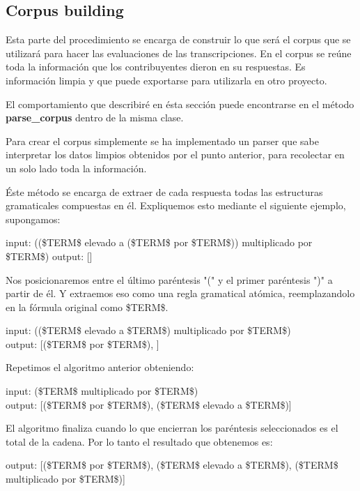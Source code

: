 \subsection{Corpus building}

Esta parte del procedimiento se encarga de construir lo que será el corpus que se utilizará para hacer las evaluaciones de las transcripciones. En el corpus se reúne toda la información que los contribuyentes dieron en su respuestas. Es información limpia y que puede exportarse para utilizarla en otro proyecto.

El comportamiento que describiré en ésta sección puede encontrarse en el método \textbf{parse\_corpus} dentro de la misma clase.

Para crear el corpus simplemente se ha implementado un parser que sabe interpretar los datos limpios obtenidos por el punto anterior, para recolectar en un solo lado toda la información.

Éste método se encarga de extraer de cada respuesta todas las estructuras gramaticales compuestas en él. Expliquemos esto mediante el siguiente ejemplo, supongamos:

\begin{tcolorbox}
input: ((\$TERM\$ elevado a (\$TERM\$ por \$TERM\$)) multiplicado por \$TERM\$)
output: []
\end{tcolorbox}

Nos posicionaremos entre el último paréntesis "(" y el primer paréntesis ")" a partir de él. Y extraemos eso como una regla gramatical atómica, reemplazandolo en la fórmula original como \$TERM\$.

\begin{tcolorbox}
input: ((\$TERM\$ elevado a \$TERM\$) multiplicado por \$TERM\$) \\
output: [(\$TERM\$ por \$TERM\$), ]
\end{tcolorbox}

Repetimos el algoritmo anterior obteniendo:

\begin{tcolorbox}
input: (\$TERM\$ multiplicado por \$TERM\$) \\
output: [(\$TERM\$ por \$TERM\$), (\$TERM\$ elevado a \$TERM\$)]
\end{tcolorbox}

El algoritmo finaliza cuando lo que encierran los paréntesis seleccionados es el total de la cadena. Por lo tanto el resultado que obtenemos es:

\begin{tcolorbox}
output: [(\$TERM\$ por \$TERM\$), (\$TERM\$ elevado a \$TERM\$), (\$TERM\$ multiplicado por \$TERM\$)]
\end{tcolorbox}


